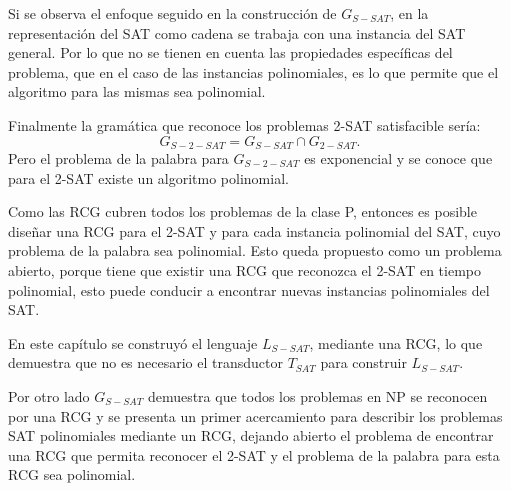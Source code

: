 Si se observa el enfoque seguido en la construcción de $G_{S-SAT}$, en la representación del SAT como cadena se trabaja con una instancia del SAT general. Por lo que no se tienen en cuenta las propiedades específicas del problema, que en el caso de las instancias polinomiales, es lo que permite que el algoritmo para las mismas sea polinomial.

Finalmente la gramática que reconoce los problemas 2-SAT satisfacible sería:
$$G_{S-2-SAT}=G_{S-SAT}\cap G_{2-SAT}.$$
Pero el problema de la palabra para $G_{S-2-SAT}$ es exponencial y se conoce que para el 2-SAT existe un algoritmo polinomial.

Como las RCG cubren todos los problemas de la clase P, entonces es posible diseñar una RCG para el 2-SAT y para cada instancia polinomial del SAT, cuyo problema de la palabra sea polinomial. 
Esto queda propuesto como un problema abierto, porque tiene que existir una RCG que reconozca el 2-SAT en tiempo polinomial, 
esto puede conducir a encontrar nuevas instancias polinomiales del SAT.

En este capítulo se construyó el lenguaje $L_{S-SAT}$, mediante una RCG, lo que demuestra que no es necesario el transductor $T_{SAT}$ para construir $L_{S-SAT}$.

Por otro lado $G_{S-SAT}$ demuestra que todos los problemas en NP se reconocen por una RCG y se presenta un primer
acercamiento para describir los problemas SAT polinomiales mediante un RCG, dejando abierto el problema de
encontrar una RCG que permita reconocer el 2-SAT y el problema de la palabra para esta RCG sea polinomial.
